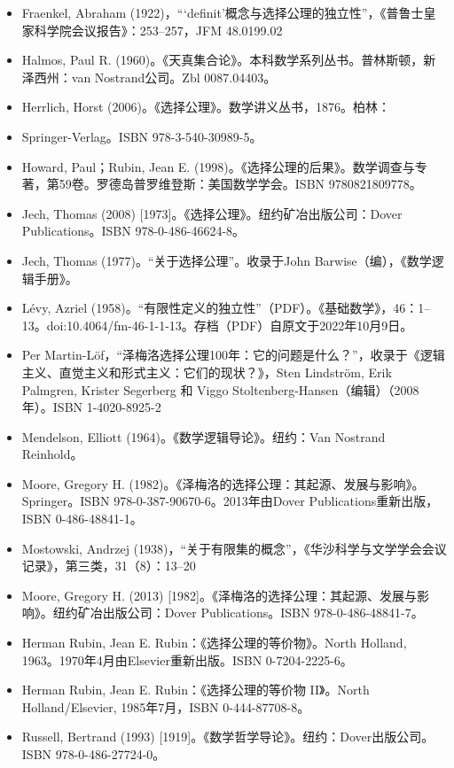 \begin{itemize}
\item Fraenkel, Abraham (1922)，“‘definit’概念与选择公理的独立性”，《普鲁士皇家科学院会议报告》：253–257，JFM 48.0199.02  
\item Halmos, Paul R. (1960)。《天真集合论》。本科数学系列丛书。普林斯顿，新泽西州：van Nostrand公司。Zbl 0087.04403。  
\item Herrlich, Horst (2006)。《选择公理》。数学讲义丛书，1876。柏林：\item Springer-Verlag。ISBN 978-3-540-30989-5。  
\item Howard, Paul；Rubin, Jean E. (1998)。《选择公理的后果》。数学调查与专著，第59卷。罗德岛普罗维登斯：美国数学学会。ISBN 9780821809778。  
\item Jech, Thomas (2008) [1973]。《选择公理》。纽约矿冶出版公司：Dover Publications。ISBN 978-0-486-46624-8。  
\item Jech, Thomas (1977)。“关于选择公理”。收录于John Barwise（编），《数学逻辑手册》。  
\item Lévy, Azriel (1958)。“有限性定义的独立性”（PDF）。《基础数学》，46：1–13。doi:10.4064/fm-46-1-1-13。存档（PDF）自原文于2022年10月9日。
\item Per Martin-Löf，“泽梅洛选择公理100年：它的问题是什么？”，收录于《逻辑主义、直觉主义和形式主义：它们的现状？》，Sten Lindström, Erik Palmgren, Krister Segerberg 和 Viggo Stoltenberg-Hansen（编辑）（2008年）。ISBN 1-4020-8925-2  
\item Mendelson, Elliott (1964)。《数学逻辑导论》。纽约：Van Nostrand Reinhold。  
\item Moore, Gregory H. (1982)。《泽梅洛的选择公理：其起源、发展与影响》。Springer。ISBN 978-0-387-90670-6。2013年由Dover Publications重新出版，ISBN 0-486-48841-1。  
\item Mostowski, Andrzej (1938)，“关于有限集的概念”，《华沙科学与文学学会会议记录》，第三类，31（8）：13–20  
\item Moore, Gregory H. (2013) [1982]。《泽梅洛的选择公理：其起源、发展与影响》。纽约矿冶出版公司：Dover Publications。ISBN 978-0-486-48841-7。
\item Herman Rubin, Jean E. Rubin：《选择公理的等价物》。North Holland, 1963。1970年4月由Elsevier重新出版。ISBN 0-7204-2225-6。  
\item Herman Rubin, Jean E. Rubin：《选择公理的等价物 II》。North Holland/Elsevier, 1985年7月，ISBN 0-444-87708-8。  
\item Russell, Bertrand (1993) [1919]。《数学哲学导论》。纽约：Dover出版公司。ISBN 978-0-486-27724-0。  

\end{itemize}
